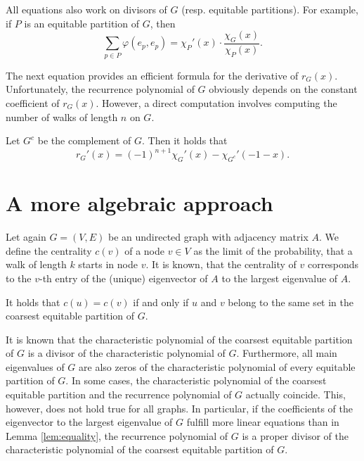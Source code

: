 \documentclass[a4paper,12pt]{article}
\begin{document}
\begin{remark}
All equations also work on divisors of $G$ (resp. equitable partitions). For example, if $P$ is an equitable partition of $G$, then
$$
\sum_{p\in P}\varphi(e_p,e_p) = \chi_P'(x) \cdot \frac{\chi_G(x)}{\chi_P(x)}.
$$
\end{remark}

The next equation provides an efficient formula for the derivative of $r_G(x)$. Unfortunately, the recurrence polynomial of $G$ obviously depends on the constant coefficient of $r_G(x)$. However, a direct computation involves computing the number of walks of length $n$ on $G$.

\begin{lemma}
Let $G^c$ be the complement of $G$. Then it holds that
$$
r_G'(x) = (-1)^{n+1}\chi_G'(x) - \chi_{G^c}'(-1-x).
$$
\end{lemma}

\section{A more algebraic approach}

Let again $G=(V,E)$ be an undirected graph with adjacency matrix $A$. We define the centrality $c(v)$ of a node $v\in V$ as the limit of the probability, that a walk of length $k$ starts in node $v$. It is known, that the centrality of $v$ corresponds to the $v$-th entry of the (unique) eigenvector of $A$ to the largest eigenvalue of $A$.

\begin{lemma}\label{lem:equality}
It holds that $c(u) = c(v)$ if and only if $u$ and $v$ belong to the same set in the coarsest equitable partition of $G$.
\end{lemma}

It is known that the characteristic polynomial of the coarsest equitable partition of $G$ is a divisor of the characteristic polynomial of $G$. Furthermore, all main eigenvalues of $G$ are also zeros of the characteristic polynomial of every equitable partition of $G$. In some cases, the characteristic polynomial of the coarsest equitable partition and the recurrence polynomial of $G$ actually coincide. This, however, does not hold true for all graphs. In particular, if the coefficients of the eigenvector to the largest eigenvalue of $G$ fulfill more linear equations than in Lemma \ref{lem:equality}, the recurrence polynomial of $G$ is a proper divisor of the characteristic polynomial of the coarsest equitable partition of $G$.
\end{document}
